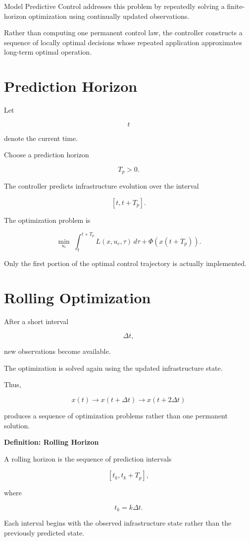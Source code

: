 \documentclass[11pt,fleqn]{book}
\numberwithin{equation}{chapter}
\newenvironment{definition}[1]
  {\begin{definitionEnv}
   \noindent\textbf{Definition: #1}\par\smallskip}
  {\end{definitionEnv}}
\theoremstyle{plain}
\theoremstyle{definition}
\theoremstyle{remark}
\begin{document}
Model Predictive Control addresses this problem by repeatedly solving a
finite-horizon optimization using continually updated observations.

Rather than computing one permanent control law, the controller
constructs a sequence of locally optimal decisions whose repeated
application approximates long-term optimal operation.


\section{Prediction Horizon}

Let

\[
t
\]

denote the current time.

Choose a prediction horizon

\[
T_p>0.
\]

The controller predicts infrastructure evolution over the interval

\[
[t,t+T_p].
\]

The optimization problem is

\[
\min_{u_c}
\;
\int_t^{t+T_p}
L(x,u_c,\tau)
\,d\tau
+
\Phi(x(t+T_p)).
\]

Only the first portion of the optimal control trajectory is actually
implemented.


\section{Rolling Optimization}

After a short interval

\[
\Delta t,
\]

new observations become available.

The optimization is solved again using the updated infrastructure state.

Thus,

\[
x(t)
\rightarrow
x(t+\Delta t)
\rightarrow
x(t+2\Delta t)
\]

produces a sequence of optimization problems rather than one permanent
solution.


\begin{definition}{Rolling Horizon}

A rolling horizon is the sequence of prediction intervals

\[
[t_k,t_k+T_p],
\]

where

\[
t_k=k\Delta t.
\]

Each interval begins with the observed infrastructure state rather than
the previously predicted state.

\end{definition}
\end{document}

